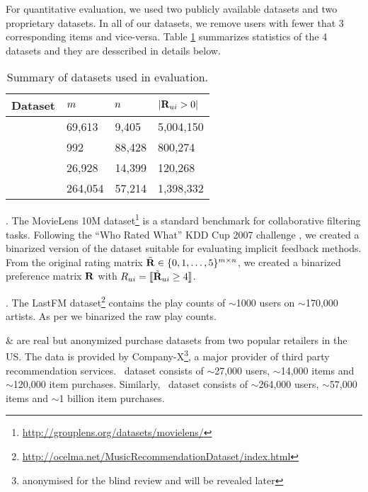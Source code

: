 For quantitative evaluation, we used two publicly available datasets and two proprietary datasets. In all of our datasets, we remove users with fewer
that 3 corresponding items and vice-versa. Table \ref{tbl:datasets} summarizes statistics of the 4 datasets and they are desscribed in details below.

\begin{table}
	\centering
	\caption{Summary of datasets used in evaluation.}
	\label{tbl:datasets}
	
	\begin{tabular}{llll}
	\toprule
	\toprule	
	\textbf{Dataset} & $m$ & $n$ & $ | \mathbf{R}_{ui} > 0 | $ \\
	\toprule
	\MLens  & 69,613 & 9,405 & 5,004,150 \\
	\LastFM & 992 & 88,428 & 800,274\\
	\Guitar & 26,928 & 14,399 & 120,268 \\
	\Lowes & 264,054 & 57,214 & 1,398,332 \\
	\bottomrule
	\end{tabular}
\end{table}

\MLens. The MovieLens 10M dataset\footnote{\scriptsize \url{http://grouplens.org/datasets/movielens/}} is a standard benchmark for collaborative filtering tasks.
Following the ``Who Rated What'' KDD Cup 2007 challenge \citep{Bennett:2007}, we created a binarized version of the dataset suitable for evaluating implicit feedback methods.
From the original rating matrix $\tilde{\mathbf{R}} \in \{ 0, 1, \ldots, 5 \}^{m \times n}$, we created a binarized preference matrix $\mathbf{R}$ with $R_{ui} = \llbracket \tilde{\mathbf{R}}_{ui} \geq 4 \rrbracket$.

\LastFM. The LastFM dataset\footnote{{\scriptsize \url{http://ocelma.net/MusicRecommendationDataset/index.html}}} \citep{Celma:2008} contains the play counts of $\sim$1000 users on $\sim$170,000 artists. As per \MLens we binarized the raw play counts.


\Guitar \& \Lowes  are real but anonymized purchase datasets from two popular retailers in the US. The data is provided by Company-X\footnote{{\scriptsize anonymised for the blind review and will be revealed later}}, a major provider of third party recommendation services. \Guitar \ dataset consists of $\sim$27,000 users, $\sim$14,000 items and $\sim$120,000 item purchases. Similarly, \Lowes \ dataset consists of $\sim$264,000 users, $\sim$57,000 items and $\sim$1 billion item purchases. 

